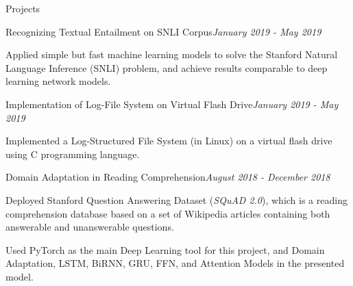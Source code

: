 \documentclass{resume} %
\begin{document}
\begin{rSection}{Projects}

\begin{rSubsection}{Recognizing Textual Entailment on SNLI Corpus}{\em January 2019 - May 2019}{}{}
\item Applied simple but fast machine learning models to solve the Stanford Natural Language Inference (SNLI) problem, and achieve results comparable to deep learning network models. 
\end{rSubsection}
 


\begin{rSubsection}{Implementation of Log-File System on Virtual Flash Drive}{\em January 2019 - May 2019}{}{}
\item Implemented a Log-Structured File System (in Linux) on a virtual flash drive using C programming language.
\end{rSubsection}



\begin{rSubsection}{Domain Adaptation in Reading Comprehension}{\em August 2018 - December 2018}{}{}%
\item Deployed Stanford Question Answering Dataset (\textit{SQuAD 2.0}), which is a reading comprehension database based on a set of Wikipedia articles containing both answerable and unanswerable questions.
\item Used PyTorch as the main Deep Learning tool for this project, and Domain Adaptation, LSTM, BiRNN, GRU, FFN, and Attention Models in the presented model. 
\end{rSubsection}


%




\end{rSection}
\end{document}
